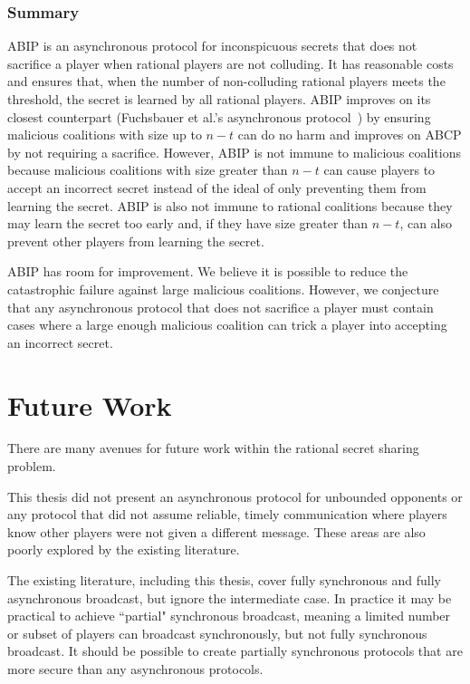 \documentclass{dalcsthesis}
\begin{document}
\subsection{Summary}

ABIP is an asynchronous protocol for inconspicuous secrets that does not sacrifice a player when rational players are not colluding. It has reasonable costs and ensures that, when the number of non-colluding rational players meets the threshold, the secret is learned by all rational players. ABIP improves on its closest counterpart (Fuchsbauer et al.'s asynchronous protocol~\cite{fuch10}) by ensuring malicious coalitions with size up to $n-t$ can do no harm and improves on ABCP by not requiring a sacrifice. However, ABIP is not immune to malicious coalitions because malicious coalitions with size greater than $n-t$ can cause players to accept an incorrect secret instead of the ideal of only preventing them from learning the secret. ABIP is also not immune to rational coalitions because they may learn the secret too early and, if they have size greater than $n-t$, can also prevent other players from learning the secret.

ABIP has room for improvement. We believe it is possible to reduce the catastrophic failure against large malicious coalitions. However, we conjecture that any asynchronous protocol that does not sacrifice a player must contain cases where a large enough malicious coalition can trick a player into accepting an incorrect secret.



\chapter{Future Work}
\label{chapter:Future}

There are many avenues for future work within the rational secret sharing problem.

This thesis did not present an asynchronous protocol for unbounded opponents or any protocol that did not assume reliable, timely communication where players know other players were not given a different message. These areas are also poorly explored by the existing literature.

The existing literature, including this thesis, cover fully synchronous and fully asynchronous broadcast, but ignore the intermediate case. In practice it may be practical to achieve ``partial" synchronous broadcast, meaning a limited number or subset of players can broadcast synchronously, but not fully synchronous broadcast. It should be possible to create partially synchronous protocols that are more secure than any asynchronous protocols.
\end{document}
